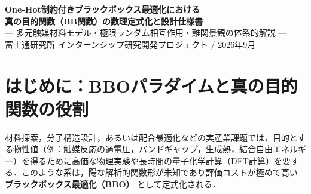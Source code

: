 \documentclass[11pt,a4paper]{ltjsarticle}
\begin{document}
\begin{center}
\vspace*{-6mm}
{\LARGE\textbf{One-Hot制約付きブラックボックス最適化における\\[1.5mm]真の目的関数（BB関数）の数理定式化と設計仕様書}}\\[2.0mm]
{\large--- 多元触媒材料モデル・極限ランダム相互作用・難関景観の体系的解説 ---}\\[1.5mm]
{\normalsize 富士通研究所 インターンシップ研究開発プロジェクト \quad / \quad 2026年9月}
\vspace{1mm}
\end{center}

\begin{abstract}
\noindent
本仕様書は，One-Hot制約（カテゴリカル選択制約）を伴うブラックボックス最適化（Black-Box Optimization: BBO）において，アルゴリズム評価の真の基準（Ground Truth）となる「真の目的関数（以下，BB関数 $y = f_{\mathrm{true}}(\bm{x})$）」の数理モデル，物理・材料探索の背景，および実装仕様を体系的にまとめたものである．本プロジェクトでは，(1) 特定吸着サイト間の協同触媒効果を模したマルチスケール強相互作用モデル（$Q_{\mathrm{materials}}$），(2) アルゴリズムの基礎スケーリング限界および状態空間スパース性を検証する全結合ランダム相互作用モデル（$Q_{\mathrm{random}}$），(3) 欺瞞的景観や結合強度変動を検証する境界条件モデル，の3系統を実装・運用している．本稿では，これらの数理構造，One-Hot制約下での有効部分空間の幾何学的性質，BBO閉ループにおける評価プロトコル，およびソースコードとの対応関係を網羅的に解説する．
\end{abstract}

\vspace{-1mm}

\section{はじめに：BBOパラダイムと真の目的関数の役割}
\label{sec:intro}
材料探索，分子構造設計，あるいは配合最適化などの実産業課題では，目的とする物性値（例：触媒反応の過電圧，バンドギャップ，生成熱，結合自由エネルギー）を得るために高価な物理実験や長時間の量子化学計算（DFT計算）を要する．このような系は，陽な解析的関数形が未知であり評価コストが極めて高い \textbf{ブラックボックス最適化（BBO）} として定式化される．
\end{document}
